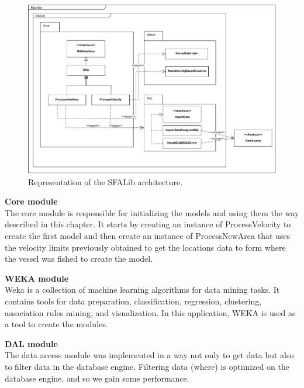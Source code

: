 \begin{figure}[h]
\centering
\includegraphics[width=1.0\linewidth]{Chapters/img/SFALib_Prof.pdf}
\caption{Representation of the SFALib architecture.}
\label{fig:SFALib_Prof}
\end{figure}



\textbf{Core module} \\The core module is responsible for initializing the models and using them the way described in this chapter. It starts by creating an instance of ProcessVelocity to create the first model and then create an instance of ProcessNewArea that uses the velocity limits previously obtained to get the locations data to form where the vessel was fished to create the model.

\textbf{WEKA module} \\Weka is a collection of machine learning algorithms for data mining tasks. It contains tools for data preparation, classification, regression, clustering, association rules mining, and visualization. In this application, WEKA is used as a tool to create the modules.

\textbf{DAL module} \\The data access module was implemented in a way not only to get data but also to filter data in the database engine. Filtering data (where) is optimized on the database engine, and so we gain some performance.




